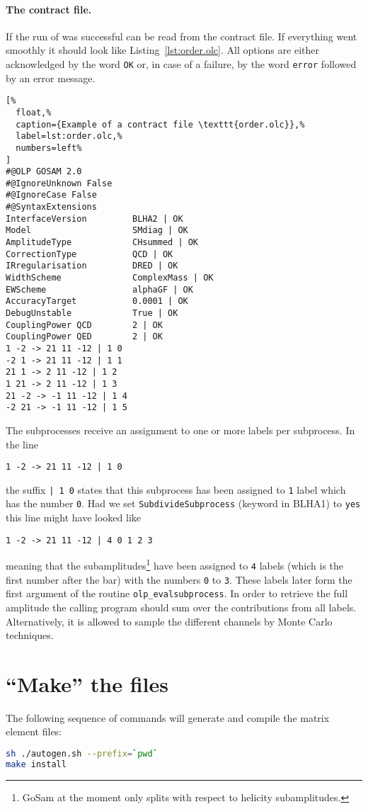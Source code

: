 \paragraph{The contract file.}
If the run of \gosam{} was successful can be read from the contract file.
If everything went smoothly it should look like Listing~\ref{lst:order.olc}.
All options are either acknowledged by the word \texttt{OK} or, in case
of a failure, by the word \texttt{error} followed by an error message.

\begin{lstlisting}[%
  float,%
  caption={Example of a contract file \texttt{order.olc}},%
  label=lst:order.olc,%
  numbers=left%
]
#@OLP GOSAM 2.0
#@IgnoreUnknown False
#@IgnoreCase False
#@SyntaxExtensions
InterfaceVersion         BLHA2 | OK
Model                    SMdiag | OK
AmplitudeType            CHsummed | OK
CorrectionType           QCD | OK
IRregularisation         DRED | OK
WidthScheme              ComplexMass | OK
EWScheme                 alphaGF | OK
AccuracyTarget           0.0001 | OK
DebugUnstable            True | OK
CouplingPower QCD        2 | OK
CouplingPower QED        2 | OK
1 -2 -> 21 11 -12 | 1 0
-2 1 -> 21 11 -12 | 1 1
21 1 -> 2 11 -12 | 1 2
1 21 -> 2 11 -12 | 1 3
21 -2 -> -1 11 -12 | 1 4
-2 21 -> -1 11 -12 | 1 5
\end{lstlisting}

The subprocesses receive an assignment to one or more
labels per subprocess. In the line
\begin{lstlisting}
1 -2 -> 21 11 -12 | 1 0
\end{lstlisting}
the suffix \texttt{| 1 0}
states that this subprocess has been assigned to \texttt{1}
label which has the number \texttt{0}. 
Had we set \texttt{SubdivideSubprocess} (keyword in BLHA1)
to \texttt{yes} this line might have looked like
\begin{lstlisting}
1 -2 -> 21 11 -12 | 4 0 1 2 3
\end{lstlisting}
meaning that the subamplitudes\footnote{GoSam at the moment only splits
with respect to helicity subamplitudes.} have been assigned to
\texttt{4} labels (which is the first number after the bar) with
the numbers \texttt{0} to \texttt{3}. These labels later form the
first argument of the routine \texttt{olp\_evalsubprocess}.
In order to retrieve the full amplitude the calling program should sum
over the contributions from all labels. Alternatively, it is allowed to
sample the different channels by Monte Carlo techniques.

\section{``Make'' the files}
The following sequence of commands will generate and compile the matrix
element files:
\begin{lstlisting}[language=bash]
sh ./autogen.sh --prefix=`pwd`
make install
\end{lstlisting}

